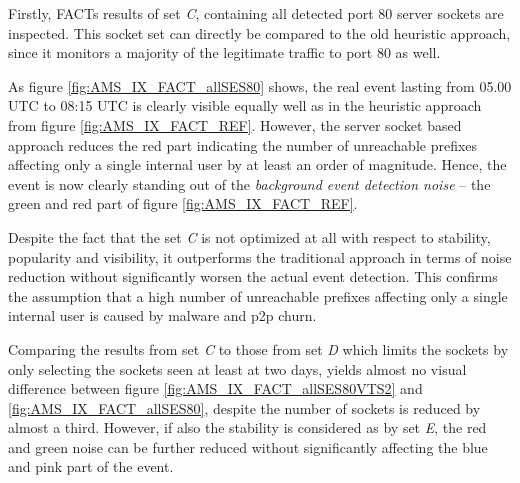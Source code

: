 Firstly, \gls{FACT}s results of set \emph{C}, containing all detected port 80 \glspl{server socket} are inspected. 
This socket set can directly be compared to the old heuristic approach, since it monitors a majority of the legitimate traffic to port 80 as well. 

As figure \ref{fig:AMS_IX_FACT_allSES80} shows, the real event lasting from 05.00 UTC to 08:15 UTC is clearly visible equally well as in the heuristic approach from figure \ref{fig:AMS_IX_FACT_REF}. 
However, the \gls{server socket} based approach reduces the red part indicating the number of unreachable prefixes affecting only a single internal user by at least an order of magnitude. 
Hence, the event is now clearly standing out of the \emph{background event detection noise} -- the green and red part of figure \ref{fig:AMS_IX_FACT_REF}. 

Despite the fact that the set \emph{C} is not optimized at all with respect to stability, popularity and visibility, it outperforms the traditional approach in terms of noise reduction without significantly worsen the actual event detection. 
This confirms the assumption that a high number of unreachable prefixes affecting only a single internal user is caused by malware and \gls{p2p} churn.

Comparing the results from set \emph{C} to those from set \emph{D} which limits the sockets by only selecting the sockets seen at least at two days, yields almost no visual difference between figure \ref{fig:AMS_IX_FACT_allSES80VTS2} and \ref{fig:AMS_IX_FACT_allSES80}, despite the number of sockets is reduced by almost a third. 
However, if also the stability is considered as by set \emph{E}, the red and green noise can be further reduced without significantly affecting the blue and pink part of the event.

